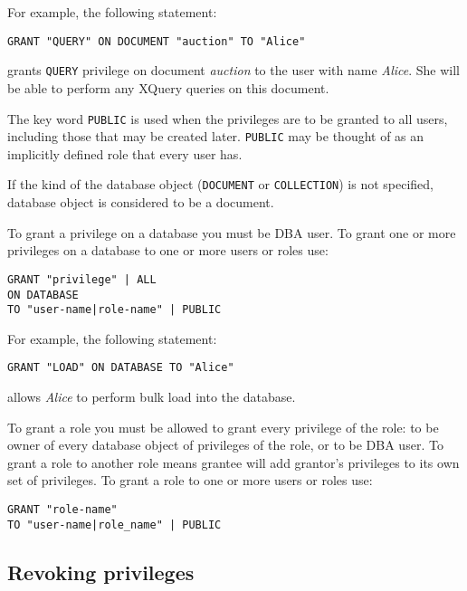 \documentclass[a4paper,12pt]{article}
\begin{document}
For example, the following statement:

\begin{verbatim}
GRANT "QUERY" ON DOCUMENT "auction" TO "Alice"
\end{verbatim}

grants \verb!QUERY! privilege on document \emph{auction} to the user with name
\emph{Alice}. She will be able to perform any XQuery queries on this document.

The key word \verb!PUBLIC! is used when the privileges are to be granted to all
users, including those that may be created later. \verb!PUBLIC! may be thought
of as an implicitly defined role that every user has.

If the kind of the database object (\verb!DOCUMENT! or \verb!COLLECTION!) is not
specified, database object is considered to be a document.

To grant a privilege on a database you must be DBA user. To grant one or more
privileges on a database to one or more users or roles use:

\begin{verbatim}
GRANT "privilege" | ALL
ON DATABASE
TO "user-name|role-name" | PUBLIC
\end{verbatim}

For example, the following statement:

\begin{verbatim}
GRANT "LOAD" ON DATABASE TO "Alice"
\end{verbatim}

allows \emph{Alice} to perform bulk load into the database.

To grant a role you must be allowed to grant every privilege of the role: to be
owner of every database object of privileges of the role, or to be DBA user. To
grant a role to another role means grantee will add grantor's privileges to its
own set of privileges. To grant a role to one or more users or roles use:

\begin{verbatim}
GRANT "role-name"
TO "user-name|role_name" | PUBLIC
\end{verbatim}


\subsection{Revoking privileges}
\end{document}
